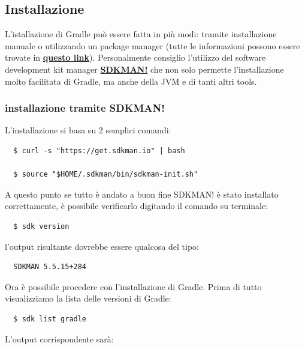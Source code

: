 \subsection{Installazione}
L'istallazione di Gradle può essere fatta in più modi: tramite installazione manuale o utilizzando un package manager (tutte le informazioni possono essere trovate in \textbf{\href{https://gradle.org/install/}{questo link}}). Personalmente consiglio l'utilizzo del software development kit manager \textbf{\href{http://sdkman.io/}{SDKMAN!}} che non solo permette l'installazione molto facilitata di Gradle, ma anche della JVM e di tanti altri tools.

\subsubsection{installazione tramite SDKMAN!}
L'installazione si basa su 2 semplici comandi:
\begin{verbatim}
  $ curl -s "https://get.sdkman.io" | bash
  
  $ source "$HOME/.sdkman/bin/sdkman-init.sh" \end{verbatim}
A questo punto se tutto è andato a buon fine SDKMAN! è stato installato correttamente, è possibile verificarlo digitando il comando su terminale:
\begin{verbatim}
  $ sdk version \end{verbatim}
l'output risultante dovrebbe essere qualcosa del tipo:
\begin{verbatim}
  SDKMAN 5.5.15+284 \end{verbatim}
Ora è possibile procedere con l'installazione di Gradle. Prima di tutto visualizziamo la lista delle versioni di Gradle:
\begin{verbatim}
  $ sdk list gradle \end{verbatim}
L'output corrispondente sarà:

